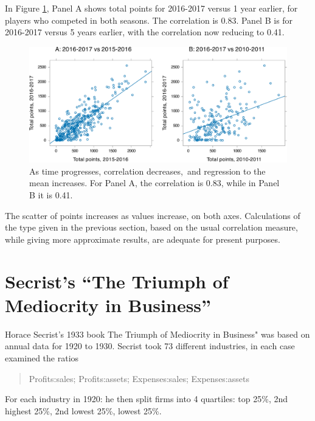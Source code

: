 \documentclass[
  10pt,
  b5paper]{book}
\begin{document}
In Figure \ref{fig:NBA}, Panel A shows total points for
2016-2017 versus 1 year earlier, for players who competed
in both seasons. The correlation is 0.83. Panel B is
for 2016-2017 versus 5 years earlier, with the correlation
now reducing to 0.41.

\begin{figure}[H]

{\centering \includegraphics[width=1\linewidth]{07-regress_files/figure-latex/NBA-1} 

}

\caption{As time progresses, correlation decreases, and regression to the mean increases.  For Panel A, the correlation is 0.83, while in Panel B it is 0.41.}\label{fig:NBA}
\end{figure}

The scatter of points increases as values increase, on both axes.
Calculations of the type given in the previous section, based on
the usual correlation measure, while giving more approximate results,
are adequate for present purposes.

\hypertarget{secrists-the-triumph-of-mediocrity-in-business}{%
\section{Secrist's ``The Triumph of Mediocrity in Business''}\label{secrists-the-triumph-of-mediocrity-in-business}}

Horace Secrist's 1933 book The Triumph of Mediocrity in Business"
was based on annual data for 1920 to 1930. Secrist took 73 different
industries, in each case examined the ratios

\begin{quote}
Profits:sales; Profits:assets; Expenses:sales; Expenses:assets
\end{quote}

For each industry in 1920: he then split firms into 4 quartiles: top 25\%,
2nd highest 25\%, 2nd lowest 25\%, lowest 25\%.
\end{document}
